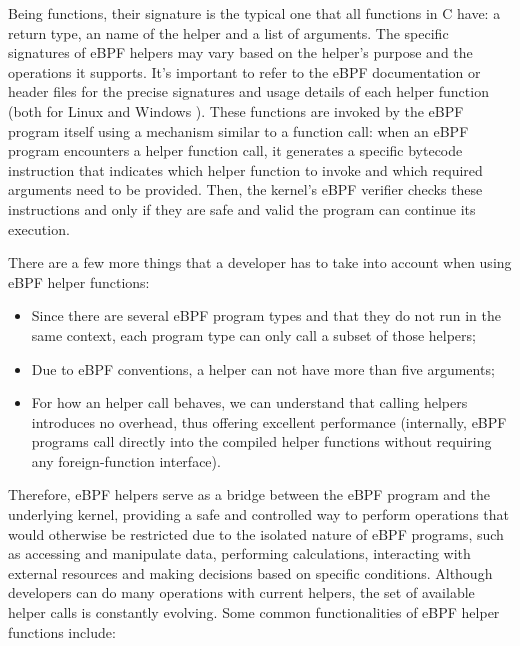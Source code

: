 Being functions, their signature is the typical one that all functions in C have: a return type, an name of the helper and a list of arguments.
The specific signatures of eBPF helpers may vary based on the helper's purpose and the operations it supports. 
It's important to refer to the eBPF documentation or header files for the precise signatures and usage details of each helper function (both for Linux \cite{LinuxHelpers} and Windows \cite{WindowsHelpers}).
These functions are invoked by the eBPF program itself using a mechanism similar to a function call: when an eBPF program encounters a helper function call, it generates a specific bytecode instruction that indicates which helper function to invoke and which required arguments need to be provided.
Then, the kernel's eBPF verifier checks these instructions and only if they are safe and valid the program can continue its execution.

There are a few more things that a developer has to take into account when using eBPF helper functions:

\begin{itemize}
	\item Since there are several eBPF program types and that they do not run in the
		same context, each program type can only call a subset of those helpers;
	\item Due to eBPF conventions, a helper can not have more than five arguments;
	\item For how an helper call behaves, we can understand that calling helpers
		introduces no overhead, thus offering excellent performance (internally, eBPF programs call directly into the compiled helper functions without requiring any foreign-function interface).
\end{itemize}

Therefore, eBPF helpers serve as a bridge between the eBPF program and the underlying kernel, providing a safe and controlled way to perform operations that would otherwise be restricted due to the isolated nature of eBPF programs, such as accessing and manipulate data, performing calculations, interacting with external resources and making decisions based on specific conditions.
Although developers can do many operations with current helpers, the set of available helper calls is constantly evolving.
Some common functionalities of eBPF helper functions include:

